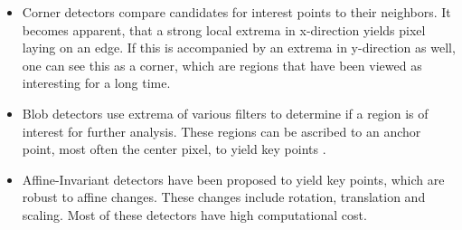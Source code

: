 \documentclass[Bachelorarbeit.tex]{subfiles}
\begin{document}
\begin{itemize}
	\item Corner detectors compare candidates for interest points to their neighbors. It becomes apparent, that a strong local extrema in x-direction yields pixel laying on an edge. If this is accompanied by an extrema in y-direction as well, one can see this as a corner, which are regions that have been viewed as interesting for a long time\citep[p. 337]{gauglitz2011evaluation}.
	\item Blob detectors use extrema of various filters to determine if a region is of interest for further analysis. These regions can be ascribed to an anchor point, most often the center pixel, to yield key points \citep[p. 338]{gauglitz2011evaluation}.
	\item Affine-Invariant detectors have been proposed to yield key points, which are robust to affine changes. These changes include rotation, translation and scaling. Most of these detectors have high computational cost.
\end{itemize}

 

\FloatBarrier
\end{document}
